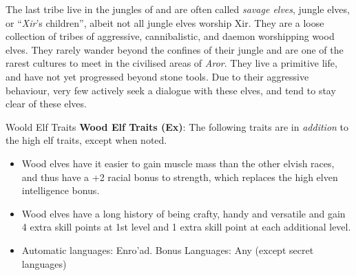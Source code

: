 The last tribe live in the jungles of  and are often
called \emph{savage elves}, jungle elves, or ``\emph{Xir}'s children'', albeit
not all jungle elves worship Xir. They are a loose collection of tribes of
aggressive, cannibalistic, and daemon worshipping wood elves. They rarely
wander beyond the confines of their jungle and are one of the rarest cultures
to meet in the civilised areas of \emph{Aror}. They live a primitive life, and
have not yet progressed beyond stone tools. Due to their aggressive behaviour,
very few actively seek a dialogue with these elves, and tend to stay clear of
these elves.

\begin{35e}{Woold Elf Traits}
  \textbf{Wood Elf Traits (Ex)}: The following traits are in \emph{addition}
  to the high elf traits, except when noted.
  \begin{itemize}[noitemsep]
    \item Wood elves have it easier to gain muscle mass than the other elvish
      races, and thus have a +2 racial bonus to strength, which replaces the
      high elven intelligence bonus.
    \item Wood elves have a long history of being crafty, handy and versatile
      and gain 4 extra skill points at 1st level and 1 extra skill point at
      each additional level.
    \item Automatic languages: Enro'ad. Bonus Languages: Any (except secret
      languages)
  \end{itemize}
\end{35e}
